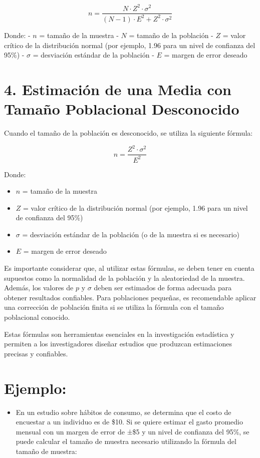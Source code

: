 \documentclass[
  letterpaper,
  DIV=11,
  numbers=noendperiod]{scrreprt}
\providecommand{\tightlist}{%
  \setlength{\itemsep}{0pt}\setlength{\parskip}{0pt}}\usepackage{longtable,booktabs,array}
\begin{document}
\[n = \frac{N \cdot Z^2 \cdot \sigma^2}{(N - 1) \cdot E^2 + Z^2 \cdot \sigma^2}\]

Donde: - \(n\) = tamaño de la muestra - \(N\) = tamaño de la población -
\(Z\) = valor crítico de la distribución normal (por ejemplo, 1.96 para
un nivel de confianza del 95\%) - \(\sigma\) = desviación estándar de la
población - \(E\) = margen de error deseado

\section{4. Estimación de una Media con Tamaño Poblacional
Desconocido}\label{estimaciuxf3n-de-una-media-con-tamauxf1o-poblacional-desconocido}

Cuando el tamaño de la población es desconocido, se utiliza la siguiente
fórmula:

\[n = \frac{Z^2 \cdot \sigma^2}{E^2}\]

Donde:

\begin{itemize}
\tightlist
\item
  \(n\) = tamaño de la muestra
\item
  \(Z\) = valor crítico de la distribución normal (por ejemplo, 1.96
  para un nivel de confianza del 95\%)
\item
  \(\sigma\) = desviación estándar de la población (o de la muestra si
  es necesario)
\item
  \(E\) = margen de error deseado
\end{itemize}

Es importante considerar que, al utilizar estas fórmulas, se deben tener
en cuenta supuestos como la normalidad de la población y la aleatoriedad
de la muestra. Además, los valores de \(p\) y \(\sigma\) deben ser
estimados de forma adecuada para obtener resultados confiables. Para
poblaciones pequeñas, es recomendable aplicar una corrección de
población finita si se utiliza la fórmula con el tamaño poblacional
conocido.

Estas fórmulas son herramientas esenciales en la investigación
estadística y permiten a los investigadores diseñar estudios que
produzcan estimaciones precisas y confiables.

\section{Ejemplo:}\label{ejemplo-2}

\begin{itemize}
\tightlist
\item
  En un estudio sobre hábitos de consumo, se determina que el costo de
  encuestar a un individuo es de \$10. Si se quiere estimar el gasto
  promedio mensual con un margen de error de ±\$5 y un nivel de
  confianza del 95\%, se puede calcular el tamaño de muestra necesario
  utilizando la fórmula del tamaño de muestra:
\end{itemize}
\end{document}
